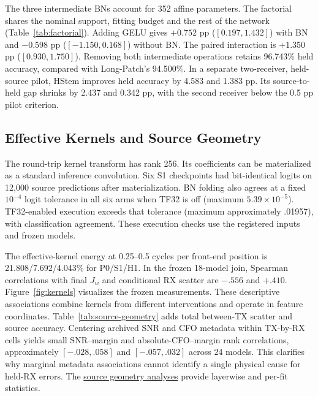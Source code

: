 \documentclass[journal]{IEEEtran}
\begin{document}
\begin{table}[!t]\centering
\caption{Four BN--GELU configurations. Accuracies and macro-F1 are held-RX-equal percentages.}
\label{tab:factorial}
\end{table}

The three intermediate BNs account for 352 affine parameters. The factorial shares the nominal support, fitting budget and the rest of the network (Table~\ref{tab:factorial}). Adding GELU gives \(+0.752\) pp (\([0.197,1.432]\)) with BN and \(-0.598\) pp (\([-1.150,0.168]\)) without BN. The paired interaction is \(+1.350\) pp (\([0.930,1.750]\)). Removing both intermediate operations retains 96.743\% held accuracy, compared with Long-Patch's 94.500\%. In a separate two-receiver, held-source pilot, HStem improves held accuracy by 4.583 and 1.383 pp. Its source-to-held gap shrinks by 2.437 and 0.342 pp, with the second receiver below the 0.5 pp pilot criterion.

\subsection{Effective Kernels and Source Geometry}
The round-trip kernel transform has rank 256. Its coefficients can be materialized as a standard inference convolution. Six S1 checkpoints had bit-identical logits on 12,000 source predictions after materialization. BN folding also agrees at a fixed \(10^{-4}\) logit tolerance in all six arms when TF32 is off (maximum \(5.39\times10^{-5}\)). TF32-enabled execution exceeds that tolerance (maximum approximately .01957), with classification agreement. These execution checks use the registered inputs and frozen models.

\begin{table}[!t]\centering
\caption{Source-validation final geometry. Each statistic is averaged across six fits.}
\label{tab:source-geometry}
\end{table}

The effective-kernel energy at 0.25--0.5 cycles per front-end position is 21.808/7.692/4.043\% for P0/S1/H1. In the frozen 18-model join, Spearman correlations with final \(J_w\) and conditional RX scatter are \(-.556\) and \(+.410\). Figure~\ref{fig:kernels} visualizes the frozen measurements. These descriptive associations combine kernels from different interventions and operate in feature coordinates. Table~\ref{tab:source-geometry} adds total between-TX scatter and source accuracy. Centering archived SNR and CFO metadata within TX-by-RX cells yields small SNR--margin and absolute-CFO--margin rank correlations, approximately \([-.028,.058]\) and \([-.057,.032]\) across 24 models. This clarifies why marginal metadata associations cannot identify a single physical cause for held-RX errors. The \href{https://github.com/hanCChan/crossatten/tree/308bb6f/25-tifs-integration}{source geometry analyses} provide layerwise and per-fit statistics.
\end{document}
